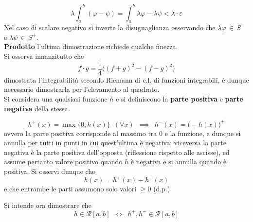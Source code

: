 \documentclass[10pt, oneside]{book}
\theoremstyle{plain}
\begin{document}
\[\lambda \int_{a}^{b} (\varphi - \psi) = \int_{a}^{b} \lambda \varphi - \lambda \psi < \lambda \cdot \varepsilon\]
Nel caso di scalare negativo si inverte la disuguaglianza osservando che $\lambda \varphi \, \in \, S^-$ e $\lambda \psi \, \in \, S^+$.
\\\textbf{Prodotto} l'ultima dimostrazione richiede qualche finezza.
\\Si osserva innanzitutto che 
\[f \cdot g = \frac{1}{4}\big((f+g)^2 - (f-g)^2\big)\]
dimostrata l'integrabilità secondo Riemann di c.l. di funzioni integrabili, è dunque necessario dimostrarla per l'elevamento al quadrato.
\\Si considera una qualsiasi funzione $h$ e si definiscono la \textbf{parte positiva} e \textbf{parte negativa} della stessa.
\begin{defin}
\[h^+(x) = \max\{0, h(x)\} \enspace (\forall x) \enspace \implies \enspace h^-(x) = \big(-h(x)\big)^+\]
ovvero la parte positiva corrisponde al massimo tra 0 e la funzione, e dunque si annulla per tutti in punti in cui quest'ultima è negativa; viceversa la parte negativa è la parte positiva dell'opposta (riflessione rispetto alle ascisse), ed assume pertanto valore positivo quando $h$ è negativa e si annulla quando è positiva. Si osservi dunque che
\[h(x) = h^+(x) - h^-(x)\]
e che entrambe le parti assumono solo valori $\geq 0$ (d.p.)
\end{defin}
Si intende ora dimostrare che
\[h \in \mathcal{R}[a,b] \enspace \Leftrightarrow \enspace h^+, h^- \in \mathcal{R}[a,b]\]
\end{document}
